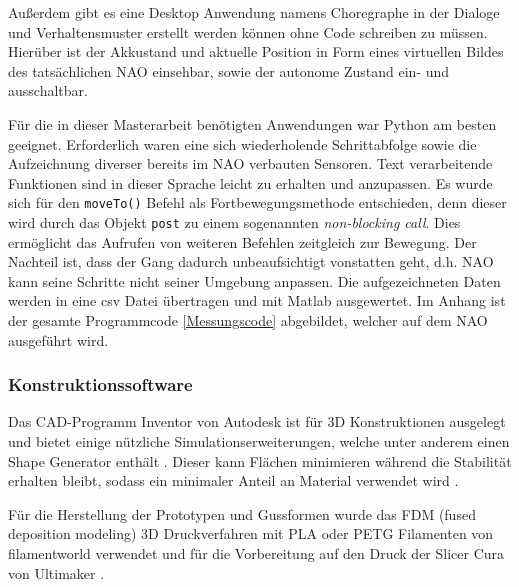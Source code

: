 Außerdem gibt es eine Desktop Anwendung namens Choregraphe in der Dialoge und Verhaltensmuster erstellt werden können ohne Code schreiben zu müssen. Hierüber ist der Akkustand und aktuelle Position in Form eines virtuellen Bildes des tatsächlichen NAO einsehbar, sowie der autonome Zustand ein- und ausschaltbar. \cite[/Choregraphe Suite/What is Choregraphe]{naoqi_dev_guide}

Für die in dieser Masterarbeit benötigten Anwendungen war Python am besten geeignet. Erforderlich waren eine sich wiederholende Schrittabfolge sowie die Aufzeichnung diverser bereits im NAO verbauten Sensoren. Text verarbeitende Funktionen sind in dieser Sprache leicht zu erhalten und anzupassen. Es wurde sich für den \texttt{moveTo()} Befehl als Fortbewegungsmethode entschieden, denn dieser wird durch das Objekt \texttt{post} zu einem sogenannten \textit{non-blocking call}. Dies ermöglicht das Aufrufen von weiteren Befehlen zeitgleich zur Bewegung. Der Nachteil ist, dass der Gang dadurch unbeaufsichtigt vonstatten geht, d.h. NAO kann seine Schritte nicht seiner Umgebung anpassen. Die aufgezeichneten Daten werden in eine csv Datei übertragen und mit Matlab ausgewertet. Im Anhang ist der gesamte Programmcode \ref{Messungscode} abgebildet, welcher auf dem NAO ausgeführt wird. 

\subsubsection*{Konstruktionssoftware}	
Das CAD-Programm Inventor von Autodesk ist für 3D Konstruktionen ausgelegt und bietet einige nützliche Simulationserweiterungen, welche unter anderem einen Shape Generator enthält \cite{inventor}. Dieser kann Flächen minimieren während die Stabilität erhalten bleibt, sodass ein minimaler Anteil an Material verwendet wird \cite{shape_generator}. 

Für die Herstellung der Prototypen und Gussformen wurde das FDM (fused deposition modeling) 3D Druckverfahren mit PLA oder PETG Filamenten von filamentworld \cite{filament} verwendet und für die Vorbereitung auf den Druck der Slicer Cura von Ultimaker \cite{cura}.

